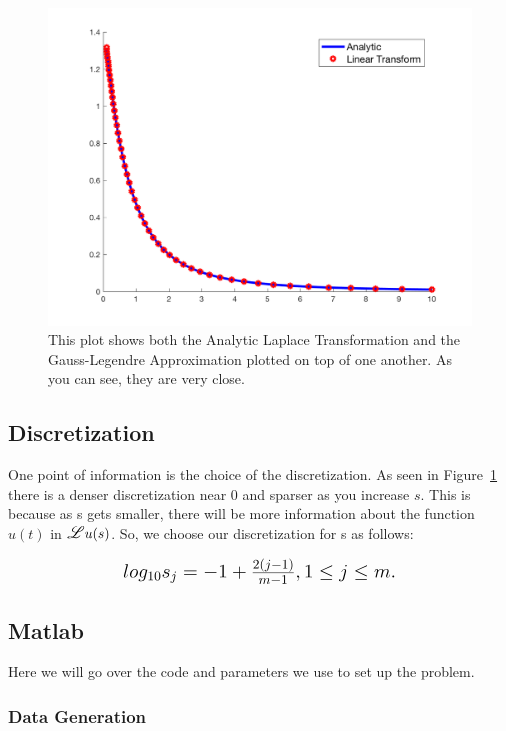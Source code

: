 \documentclass{article}
\newcommand\Laplace{\mathlarger{\mathlarger{\mathscr{L}}}}
\begin{document}
\begin{figure}[H]
    \centerline{
    \includegraphics[height = 10 cm]{Comparison.png}
    }
    \caption{\label{fig:Comparison} This plot shows both the Analytic Laplace Transformation and the Gauss-Legendre Approximation plotted on top of one another. As you can see, they are very close.}
\end{figure}

\subsection{Discretization}

One point of information is the choice of the discretization. As seen in Figure~\ref{fig:Comparison} there is a denser discretization near 0 and sparser as you increase $s$. This is because as s gets smaller, there will be more information about the function $u(t)$ in $\Laplace{u(s)}$. So, we choose our discretization for s as follows:

\begin{equation}
\mbox{\fontsize{14}{24}
\(
    log_{10}s_j = -1 + \frac{2(j - 1)}{m - 1},   1 \leq j \leq m. 
\)
}
\end{equation}

\subsection{Matlab}

Here we will go over the code and parameters we use to set up the problem.

\subsubsection{Data Generation}
\end{document}
